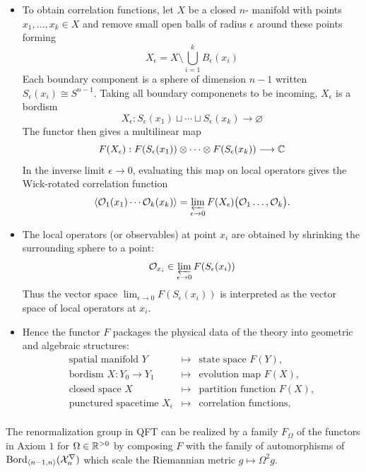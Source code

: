 \documentclass[a4paper,11pt]{article}
\begin{document}
\begin{itemize}
    \item To obtain correlation functions, let $X$ be a closed $n$- manifold with points $x_1,\dots,x_k\in X$ and remove small open balls of radius $\epsilon$ around these points forming
    \[
        X_\epsilon = X\setminus \bigcup_{i=1}^k B_\epsilon (x_i)
        \]
        Each boundary component is a sphere of dimension $n-1$ written $S_\epsilon (x_i) \cong S^{n-1}$. Taking all boundary componenets to be incoming, $X_\epsilon$ is a bordism 
        \[
        X_\epsilon: S_\epsilon (x_1) \sqcup \cdots \sqcup S_\epsilon (x_k) \longrightarrow \varnothing
        \]
        The functor then gives a multilinear map 
        \[
        F(X_\epsilon):F(S_\epsilon(x_1)) \otimes \cdots\otimes F(S_\epsilon(x_k)) \longrightarrow \mathbb{C}
        \]
        In the inverse limit $\epsilon \to 0$, evaluating this map on local operators gives the Wick-rotated correlation function
        \[
            \left\langle \mathcal{O}_1(x_1)\cdots \mathcal{O}_k (x_k) \right\rangle = \varprojlim_{\epsilon\to 0} F(X_\epsilon) \bigl(\mathcal{O}_1 \ldots, \mathcal{O}_k\bigr).
        \]
        \item The local operators (or observables) at point $x_i$ are obtained by shrinking the surrounding sphere to a point:
        \[
        \mathcal{O}_{x_i} \in \varprojlim_{\epsilon \to 0} F(S_\epsilon(x_i))
        \]
        Thus the vector space $\lim_{\epsilon \to 0} F(S_\epsilon(x_i))$ is interpreted as the vector space of local operators at $x_i$.

        \item Hence the functor $F$ packages the physical data of the theory into geometric and algebraic structures:
        \[
        \begin{array}{ccl}
            \text{spatial manifold }Y &\longmapsto & \text{state space } F(Y),  \\
             \text{bordism }X:Y_0 \to Y_1&\longmapsto & \text{evolution map }F(X),\\
             \text{closed space }X &\longmapsto & \text{partition function }F(X),\\
             \text{punctured spacetime }X_\epsilon &\longmapsto & \text{correlation functions},\\
        \end{array}
        \]
\end{itemize}

\begin{remark}
    The renormalization group in QFT can be realized by a family $F_\Omega$ of the functors in Axiom $1$ for $\Omega \in \mathbb{R}^{>0}$ by composing $F$ with the family of automorphisms of ${\rm Bord}_{\langle n-1,n\rangle}(\mathcal{X}^{\nabla}_n)$ which scale the Riemannian metric $g \mapsto \Omega^2g$. 
\end{remark}
\end{document}

